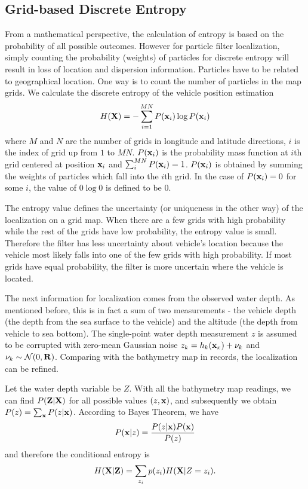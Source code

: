 \subsection{Grid-based Discrete Entropy}

From a mathematical perspective, the calculation of entropy is based on the probability of all possible outcomes. However for particle filter localization, simply counting the probability (weights) of particles for discrete entropy will result in loss of location and dispersion information. Particles have to be related to geographical location. One way is to count the number of particles in the map grids. We calculate the discrete entropy of the vehicle position estimation
\begin{equation}
H({\bf X})=-\sum_{i=1}^{MN}P({\bf x}_i)\log P({\bf x}_i)
\end{equation}
where $M$ and $N$ are the number of grids in longitude and latitude directions, $i$ is the index of grid up from $1$ to $MN$. $P({\bf x}_i)$ is the probability mass function at $i$th grid centered at position ${\bf x}_i$ and $\sum_i^{MN}P({\bf x}_i)=1$. $P({\bf x}_i)$ is obtained by summing the weights of particles which fall into the $i$th grid. In the case of $P({\bf x}_i)=0$ for some $i$, the value of $0\log 0$ is defined to be 0.

The entropy value defines the uncertainty (or uniqueness in the other way) of the localization on a grid map. When there are a few grids with high probability while the rest of the grids have low probability, the entropy value is small. Therefore the filter has less uncertainty about vehicle's location because the vehicle most likely falls into one of the few grids with high probability. If most grids have equal probability, the filter is more uncertain where the vehicle is located. %

The next information for localization comes from the observed water depth. As mentioned before, this is in fact a sum of two measurements - the vehicle depth (the depth from the sea surface to the vehicle) and the altitude (the depth from vehicle to sea bottom). The single-point water depth measurement $z$ is assumed to be corrupted with zero-mean Gaussian noise ${z}_k=h_k({\bf x}_x)+{\bf\nu}_k$ and ${\bf\nu}_k\sim\mathcal{N}(0,{\bf R})$.  Comparing with the bathymetry map in records, the localization can be refined.

Let the water depth variable be $Z$. With all the bathymetry map readings, we can find $P({\bf Z}|{\bf X})$ for all possible values $(z,{\bf x})$, and subsequently we obtain $P(z)=\sum_{\bf x}P(z|{\bf x})$. According to Bayes Theorem, we have
\begin{equation}
P({\bf x}|z)=\frac{P(z|{\bf x})P({\bf x})}{P(z)}
\end{equation}
and therefore the conditional entropy is
\begin{equation}
H({\bf X}|{\bf Z})=\sum_{{ z}_i} p({ z}_i)H({\bf X}|Z={ z}_i).
\end{equation}

